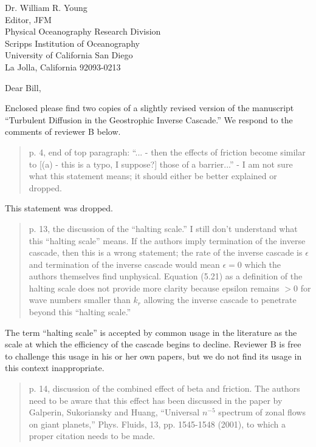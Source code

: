 \documentclass[11pt]{letter}
\begin{document}
\begin{letter}{Dr. William R. Young \\
 Editor, JFM \\
 Physical Oceanography Research Division \\
 Scripps Institution of Oceanography \\
 University of California San Diego \\
 La Jolla, California 92093-0213
 }

\opening{Dear Bill,}

Enclosed please find two copies of a slightly revised version of the
manuscript ``Turbulent Diffusion in the Geostrophic Inverse Cascade.''
We respond to the comments of reviewer B below.

\begin{quote}
p. 4, end of top paragraph:  ``... - then the effects of friction become
similar to [(a) - this is a typo, I suppose?] those of a barrier...'' - I
am not sure what this statement means; it should either be better
explained or dropped.
\end{quote}

This statement was dropped.

\begin{quote}
p. 13, the discussion of the ``halting scale.''  I still don't
understand what this ``halting scale'' means.  If the authors imply
termination of the inverse cascade, then this is a wrong statement;
the rate of the inverse cascade is $\epsilon$ and termination of the
inverse cascade would mean $\epsilon=0$ which the authors themselves
find unphysical.  Equation (5.21) as a definition of the halting scale
does not provide more clarity because epsilon remains $>0$ for wave
numbers smaller than $k_r$ allowing the inverse cascade to penetrate
beyond this ``halting scale.''
\end{quote}

The term ``halting scale'' is accepted by common usage in the
literature as the scale at which the efficiency of the cascade begins
to decline.  Reviewer B is free to challenge this usage in his or her
own papers, but we do not find its usage in this context inappropriate.

\begin{quote}
p. 14, discussion of the combined effect of beta and friction.  The
authors need to be aware that this effect has been discussed in the paper
by Galperin, Sukoriansky and Huang, ``Universal $n^{-5}$ spectrum of zonal
flows on giant planets,'' Phys. Fluids, 13, pp. 1545-1548 (2001), to which
a proper citation needs to be made.
\end{quote}


\end{letter}
\end{document}
